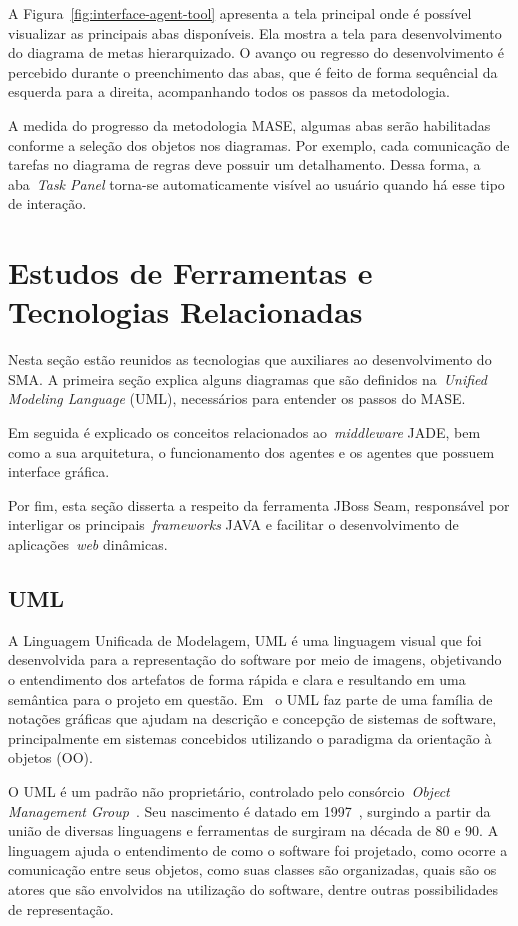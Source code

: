 A Figura~\ref{fig:interface-agent-tool} apresenta a tela principal onde é possível visualizar as principais abas disponíveis. Ela mostra a tela para desenvolvimento do diagrama de metas hierarquizado. O avanço ou regresso do desenvolvimento é percebido durante o preenchimento das abas, que é feito de forma sequêncial da esquerda para a direita, acompanhando todos os passos da metodologia.

A medida do progresso da metodologia MASE, algumas abas serão habilitadas conforme a seleção dos objetos nos diagramas. Por exemplo, cada comunicação de tarefas no diagrama de regras deve possuir um detalhamento. Dessa forma, a aba~\emph{Task Panel} torna-se automaticamente visível ao usuário quando há esse tipo de interação.

\section{Estudos de Ferramentas e Tecnologias Relacionadas}\label{section:ferramentas}

Nesta seção estão reunidos as tecnologias que auxiliares ao desenvolvimento do SMA. A primeira seção explica alguns diagramas que são definidos na~\emph{Unified Modeling Language} (UML), necessários para entender os passos do MASE.
 
Em seguida é explicado os conceitos relacionados ao~\emph{middleware} JADE, bem como a sua arquitetura, o funcionamento dos agentes e os agentes que possuem interface gráfica.

Por fim, esta seção disserta a respeito da ferramenta JBoss Seam, responsável por interligar os principais~\emph{frameworks} JAVA e facilitar o desenvolvimento de aplicações~\emph{web} dinâmicas.

\subsection{UML}

A Linguagem Unificada de Modelagem, UML é uma linguagem visual que foi desenvolvida para a representação do software por meio de imagens, objetivando o entendimento dos artefatos de forma rápida e clara e resultando em uma semântica para o projeto em questão. Em~\cite{fowler04} o UML faz parte de uma família de notações gráficas que ajudam na descrição e concepção de sistemas de software, principalmente em sistemas concebidos utilizando o paradigma da orientação à objetos (OO).

O UML é um padrão não proprietário, controlado pelo consórcio~\emph{Object Management Group}~\cite{omg20}. Seu nascimento é datado em 1997~\cite{fowler04}, surgindo a partir da união de diversas linguagens e ferramentas de surgiram na década de 80 e 90.
A linguagem ajuda o entendimento de como o software foi projetado, como ocorre a comunicação entre seus objetos, como suas classes são organizadas, quais são os atores que são envolvidos na utilização do software, dentre outras possibilidades de representação.

